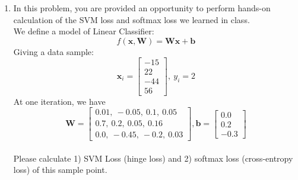 \documentclass[a4paper]{article}
\begin{document}
\begin{enumerate}
\item In this problem, you are provided an opportunity to perform hands-on calculation of the SVM loss and softmax loss we learned in class.\\
We define a model of Linear Classifier: $$f(\bm{x}, \bm{W}) = \bm{W}\bm{x}+\bm{b}$$ Giving a data sample: $$\bm{x}_i = \begin{bmatrix}-15\\ 22\\ -44\\ 56 \end{bmatrix},\ y_i=2$$ At one iteration, we have $$\bm{W}=\begin{bmatrix}0.01,\ -0.05,\ 0.1,\ 0.05\\ 0.7,\ 0.2,\ 0.05,\ 0.16\\0.0,\ -0.45,\ -0.2,\ 0.03\end{bmatrix}, \bm{b}=\begin{bmatrix}0.0\\ 0.2\\ -0.3\end{bmatrix}$$\\
Please calculate 1) SVM Loss (hinge loss) and 2) softmax loss (cross-entropy loss) of this sample point.

\end{enumerate}
\end{document}
